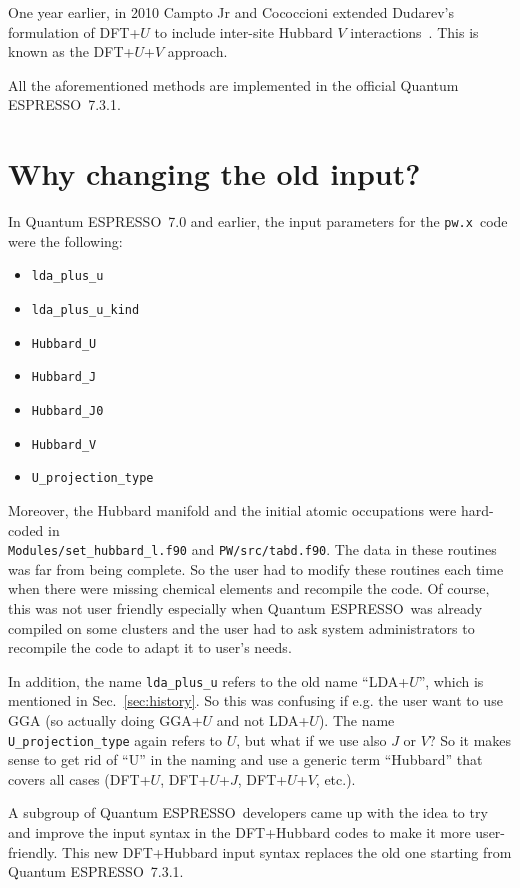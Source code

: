 \documentclass[12pt,a4paper]{article}
\def\version{7.3.1}
\def\qe{{\sc Quantum ESPRESSO}}
\def\pw{\texttt{pw.x}}
\begin{document}
One year earlier, in 2010 Campto Jr and Cococcioni extended Dudarev's formulation of DFT+$U$ to include inter-site Hubbard $V$ interactions~\cite{Campo:2010}. This is known as the DFT+$U$+$V$ approach.

All the aforementioned methods are implemented in the official \qe\ \version.


\section{Why changing the old input?}

In \qe\ 7.0 and earlier, the input parameters for the \pw\ code were the following:
\begin{itemize}
    \item \texttt{lda\_plus\_u}
    \item \texttt{lda\_plus\_u\_kind}
    \item \texttt{Hubbard\_U}
    \item \texttt{Hubbard\_J}
    \item \texttt{Hubbard\_J0}
    \item \texttt{Hubbard\_V}
    \item \texttt{U\_projection\_type}
\end{itemize}

Moreover, the Hubbard manifold and the initial atomic occupations were hard-coded in\\ \texttt{Modules/set\_hubbard\_l.f90} and \texttt{PW/src/tabd.f90}. The data in these routines was far from being complete. So the user had to modify these routines each time when there were missing chemical elements and recompile the code. Of course, this was not user friendly especially when \qe\ was already compiled on some clusters and the user had to ask system administrators to recompile the code to adapt it to user's needs. 

In addition, the name \texttt{lda\_plus\_u} refers to the old name ``LDA+$U$'', which is mentioned in Sec.~\ref{sec:history}. So this was confusing if e.g. the user want to use GGA (so actually doing GGA+$U$ and not LDA+$U$). The name \texttt{U\_projection\_type} again refers to $U$, but what if we use also $J$ or $V$? So it makes sense to get rid of ``U'' in the naming and use a generic term ``Hubbard'' that covers all cases (DFT+$U$, DFT+$U$+$J$, DFT+$U$+$V$, etc.).

A subgroup of \qe\ developers came up with the idea to try and improve the input syntax in the DFT+Hubbard codes to make it more user-friendly. This new DFT+Hubbard input syntax replaces the old one starting from \qe\ \version.
\end{document}
